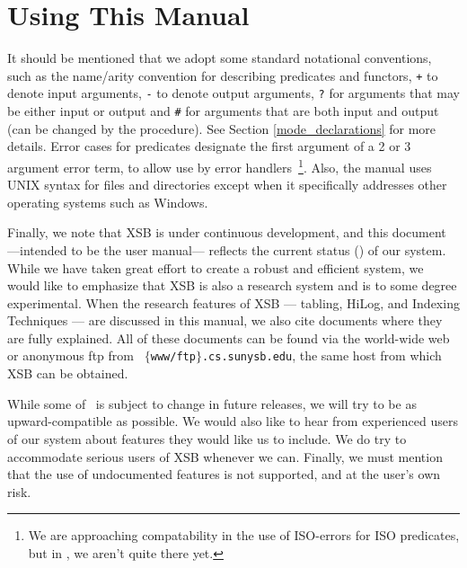 \section{Using This Manual}
It should be mentioned that we adopt some standard notational
conventions, such as the name/arity convention for describing
predicates and functors, {\tt +} to denote input arguments, {\tt -} to
denote output arguments, {\tt ?} for arguments that may be either
input or output and {\tt \#} for arguments that are both input and
output (can be changed by the procedure).  See Section
\ref{mode_declarations} for more details.   Error cases for predicates designate the first argument
of a 2 or 3 argument error term, to allow use by error
handlers~\footnote{We are approaching compatability in the use of
  ISO-errors for ISO predicates, but in \version, we aren't quite
  there yet.}.  Also, the manual uses UNIX syntax for files and
directories except when it specifically addresses other operating
systems such as Windows.

Finally, we note that XSB is under continuous development, and this
document ---intended to be the user manual--- reflects the current
status (\version) of our system.  While we have taken great effort to
create a robust and efficient system, we would like to emphasize that
XSB is also a research system and is to some degree experimental.
When the research features of XSB --- tabling, HiLog, and Indexing
Techniques --- are discussed in this manual, we also cite documents
where they are fully explained.  All of these documents can be found
via the world-wide web or anonymous ftp from {\tt
$\{$www/ftp$\}$.cs.sunysb.edu}, the same host from which XSB can be
obtained.

While some of \version\ is subject to change in future releases, we
will try to be as upward-compatible as possible. We would also like to
hear from experienced users of our system about features they would
like us to include.  We do try to accommodate serious users of XSB
whenever we can.  Finally, we must mention that the use of
undocumented features is not supported, and at the user's own risk.



